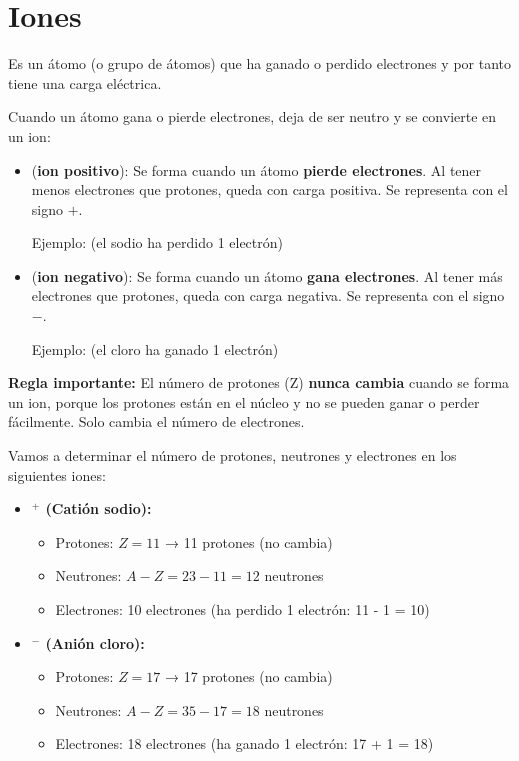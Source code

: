 \section{Iones}
\begin{definition}[ion]
    Es un átomo (o grupo de átomos) que ha ganado o perdido electrones y por tanto tiene una carga eléctrica.
\end{definition}
Cuando un átomo gana o pierde electrones, deja de ser neutro y se convierte en un ion:
\begin{itemize}
    \item {} (\textbf{ion positivo}): Se forma cuando un átomo \textbf{pierde electrones}. Al tener menos electrones que protones, queda con carga positiva. Se representa con el signo \( + \).

    Ejemplo:  (el sodio ha perdido 1 electrón)

    \item {} (\textbf{ion negativo}): Se forma cuando un átomo \textbf{gana electrones}. Al tener más electrones que protones, queda con carga negativa. Se representa con el signo \( - \).

    Ejemplo:  (el cloro ha ganado 1 electrón)
\end{itemize}
\begin{remark}
    \textbf{Regla importante:} El número de protones (Z) \textbf{nunca cambia} cuando se forma un ion, porque los protones están en el núcleo y no se pueden ganar o perder fácilmente. Solo cambia el número de electrones.
\end{remark}
\begin{example}
    Vamos a determinar el número de protones, neutrones y electrones en los siguientes iones:

    \begin{itemize}
        \item \textbf{$^{+}$ (Catión sodio):}
        \begin{itemize}
            \item Protones: \( Z = 11 \) → 11 protones (no cambia)
            \item Neutrones: \( A - Z = 23 - 11 = 12 \) neutrones
            \item Electrones: 10 electrones (ha perdido 1 electrón: 11 - 1 = 10)
        \end{itemize}

        \item \textbf{$^{-}$ (Anión cloro):}
        \begin{itemize}
            \item Protones: \( Z = 17 \) → 17 protones (no cambia)
            \item Neutrones: \( A - Z = 35 - 17 = 18 \) neutrones
            \item Electrones: 18 electrones (ha ganado 1 electrón: 17 + 1 = 18)
        \end{itemize}
    \end{itemize}
\end{example}
